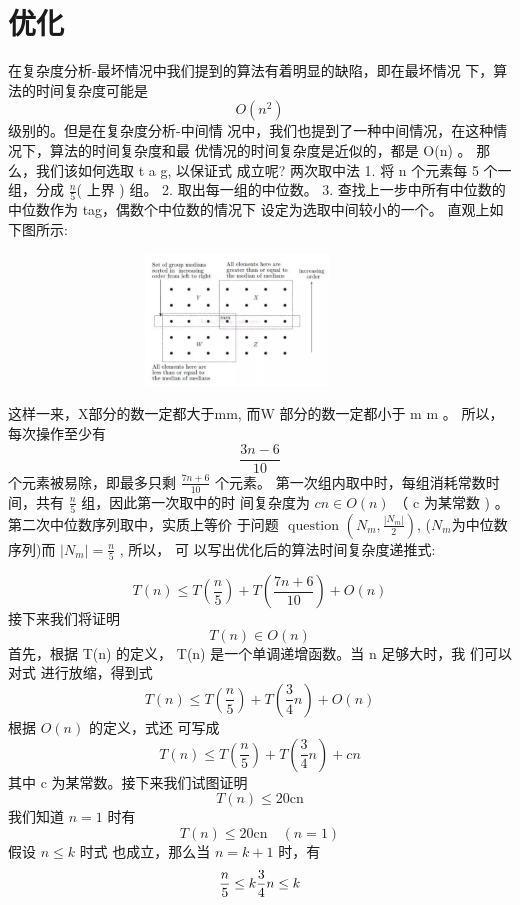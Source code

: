 \section{优化}
在复杂度分析-最坏情况中我们提到的算法有着明显的缺陷，即在最坏情况 下，算法的时间复杂度可能是 
$$O\left(n^{2}\right)$$
级别的。但是在复杂度分析-中间情 况中，我们也提到了一种中间情况，在这种情况下，算法的时间复杂度和最 优情况的时间复杂度是近似的，都是  O(n)  。
那么，我们该如何选取  t a g,  以保证式 成立呢?
两次取中法
1. 将 $ \mathrm{n}$  个元素每 5 个一组，分成  $\frac{n}{5}$(  上界  )  组。
2. 取出每一组的中位数。
3. 查找上一步中所有中位数的中位数作为 tag，偶数个中位数的情况下 设定为选取中间较小的一个。
直观上如下图所示:
\begin{figure}[h]
	\begin{minipage}[t]{1\linewidth}
		\centering
		\includegraphics[width=10cm,height=3.5cm]{image/kth2.png}
	\end{minipage}
\end{figure}
这样一来，X部分的数一定都大于mm, 而W  部分的数一定都小于  m m  。 所以，每次操作至少有  $$\frac{3 n-6}{10} $$ 个元素被易除，即最多只剩  $\frac{7 n+6}{10} $ 个元素。
第一次组内取中时，每组消耗常数时间，共有  $ \frac{n}{5} $  组，因此第一次取中的时 间复杂度为  $ c n \in O(n) $ （ c  为某常数  ) 。  第二次中位数序列取中，实质上等价 于问题 
$\text { question }\left(N_{m}, \frac{\left|N_{m}\right|}{2}\right)$,
($N_{m}$为中位数序列)而  $ \left|N_{m}\right|=\frac{n}{5} $ ,  所以， 可 以写出优化后的算法时间复杂度递推式:


$$T(n) \leq T\left(\frac{n}{5}\right)+T\left(\frac{7 n+6}{10}\right)+O(n)$$
接下来我们将证明
$$T(n) \in O(n)$$
首先，根据  T(n)  的定义，  T(n)  是一个单调递增函数。当  n  足够大时，我 们可以对式 进行放缩，得到式
$$T(n) \leq T\left(\frac{n}{5}\right)+T\left(\frac{3}{4} n\right)+O(n)$$
根据 $ O(n) $ 的定义，式还 可写成
$$T(n) \leq T\left(\frac{n}{5}\right)+T\left(\frac{3}{4} n\right)+c n$$
其中  c  为某常数。接下来我们试图证明
$$T(n) \leq 20 \mathrm{cn}$$
我们知道 $ n=1 $ 时有
$$T(n) \leq 20 \mathrm{cn} \quad(n=1)$$
假设 $ n \leq k$  时式 也成立，那么当  $n=k+1$  时，有
$$
\frac{n}{5} \leq k \\
\frac{3}{4} n \leq k
$$


